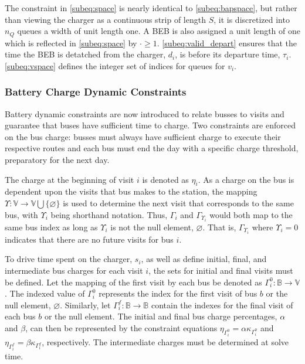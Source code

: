 \documentclass[11pt,a4paper,final]{article}
\begin{document}
The constraint in \autoref{subeq:space} is nearly identical to \autoref{subeq:bapspace}, but rather than viewing the
charger as a continuous strip of length \(S\), it is discretized into \(n_Q\) queues a width of unit length one. A BEB is
also assigned a unit length of one which is reflected in \autoref{subeq:space} by \(\cdot \geq 1\). \autoref{subeq:valid_depart}
ensures that the time the BEB is detatched from the charger, \(d_i\), is before its departure time, \(\tau_i\).
\autoref{subeq:vspace} defines the integer set of indices for queues for \(v_i\).

\subsubsection{Battery Charge Dynamic Constraints}
\label{sec:batt_dynamics}
Battery dynamic constraints are now introduced to relate busses to visits and guarantee that buses have sufficient time
to charge. Two constraints are enforced on the bus charge: busses must always have sufficient charge to execute their
respective routes and each bus must end the day with a specific charge threshold, preparatory for the next day.

The charge at the beginning of visit \(i\) is denoted as \(\eta_i\). As a charge on the bus is dependent upon the visits that
bus makes to the station, the mapping \(\Upsilon: \mathbb{V} \rightarrow \mathbb{V} \bigcup \{\varnothing\}\) is used to determine the next visit
that corresponds to the same bus, with \(\Upsilon_i\) being shorthand notation. Thus, \(\Gamma_i\) and \(\Gamma_{\Upsilon_i}\) would both map to the
same bus index as long as \(\Upsilon_i\) is not the null element, \(\varnothing\). That is, \(\Gamma_{\Upsilon_i}\) where \(\Upsilon_i = 0\) indicates
that there are no future visits for bus \(i\).

To drive time spent on the charger, \(s_i\), as well as define initial, final, and intermediate bus charges for each visit
\(i\), the sets for initial and final visits must be defined. Let the mapping of the first visit by each bus be denoted as
\(\Gamma^0_i : \mathbb{B} \rightarrow \mathbb{V}\). The indexed value of \(\Gamma^0_i\) represents the index for the first visit of bus \(b\) or
the null element, \(\varnothing\). Similarly, let \(\Gamma^f_i : \mathbb{B} \rightarrow \mathbb{B}\) contain the indexes for the final
visit of each bus \(b\) or the null element. The initial and final bus charge percentages, \(\alpha\) and \(\beta\), can then be
represented by the constraint equations \(\eta_{\Gamma^0_i} = \alpha \kappa_{\Gamma^0_i}\) and \(\eta_{\Gamma^f_i} = \beta \kappa_{\Gamma^f_i}\), respectively. The
intermediate charges must be determined at solve time.
\end{document}
